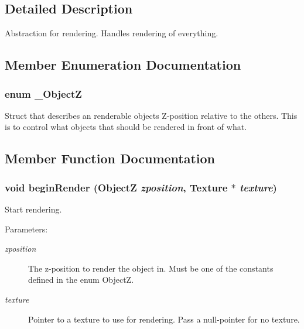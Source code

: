 \subsection{Detailed Description}
Abstraction for rendering. Handles rendering of everything. 

\subsection{Member Enumeration Documentation}
\subsubsection{\setlength{\rightskip}{0pt plus 5cm}enum {\bf \_\-ObjectZ}}\label{classEngine_1_1Renderer_aca92d07cc37302f2255feb3aa116295}


Struct that describes an renderable objects Z-position relative to the others. This is to control what objects that should be rendered in front of what. 

\subsection{Member Function Documentation}
\subsubsection{\setlength{\rightskip}{0pt plus 5cm}void beginRender ({\bf ObjectZ} {\em zposition}, Texture $\ast$ {\em texture})}\label{classEngine_1_1Renderer_a5cf1b94f3a6b99f1c2e9e6abfc5eec6}


Start rendering. \begin{Desc}
\item[Parameters:]
\begin{description}
\item[{\em zposition}]The z-position to render the object in. Must be one of the constants defined in the enum ObjectZ. \item[{\em texture}]Pointer to a texture to use for rendering. Pass a null-pointer for no texture. \end{description}
\end{Desc}
